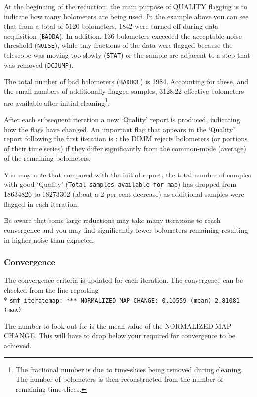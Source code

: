 At the beginning of the reduction, the main purpose of QUALITY
flagging is to indicate how many bolometers are being used. In the
example above you can see that from a total of 5120 bolometers, 1842
were turned off during data acquisition (\texttt{BADDA}). In addition,
136 bolometers exceeded the acceptable noise threshold
(\texttt{NOISE}), while tiny fractions of the data were flagged
because the telescope was moving too slowly (\texttt{STAT}) or the
sample are adjacent to a step that was removed (\texttt{DCJUMP}).

The total number of bad bolometers (\texttt{BADBOL}) is 1984.
Accounting for these, and the small numbers of additionally flagged
samples, 3128.22 effective bolometers are available after initial
cleaning\footnote{The fractional number is due to time-slices being
removed during cleaning. The number of bolometers is then
reconstructed from the number of remaining time-slices.}.


After each subsequent iteration a new `Quality' report is produced,
indicating how the flags have changed. An important flag that appears
in the `Quality' report following the first iteration is :
the DIMM rejects bolometers (or portions of their time series) if they
differ significantly from the common-mode (average) of the remaining
bolometers.

You may note that compared with the initial report, the total number
of samples with good `Quality' (\texttt{Total samples available for
  map}) has dropped from 18634826 to 18273302 (about a 2 per cent
decrease) as additional samples were flagged in each iteration.

Be aware that some large reductions may take many iterations to reach
convergence and you may find significantly fewer bolometers remaining
resulting in higher noise than expected.

\subsubsection*{Convergence}

The convergence criteria  is updated for each
iteration. The convergence can be checked from the line reporting\\*
\hspace*{0.5cm} \texttt{smf\_iteratemap: *** NORMALIZED MAP CHANGE:
  0.10559 (mean) 2.81081 (max)}

The number to look out for is the mean value of the NORMALIZED MAP CHANGE. 
This will have to drop
below your required  for convergence to be achieved.

